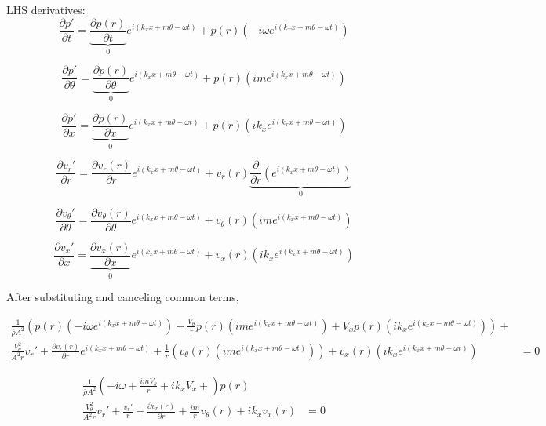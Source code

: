 LHS derivatives:
\[\frac{\partial p'}{\partial t} =
\underbrace{\frac{\partial p(r)}{\partial t}}_{0} e^{i\left(k_x x + m \theta - \omega t \right)} +
p(r) \left(-i\omega e^{i\left(k_x x + m \theta - \omega t \right)}\right) \]

\[\frac{\partial p'}{\partial \theta} = 
\underbrace{\frac{\partial p(r)}{\partial \theta}}_{0} e^{i\left(k_x x + m \theta - \omega t \right)} + 
p(r) \left(im e^{i\left(k_x x + m \theta - \omega t \right)}\right) \]

\[\frac{\partial p'}{\partial x} = \underbrace{\frac{\partial p(r)}{\partial x}}_{0} e^{i\left(k_x x + m \theta - \omega t \right)} +
p(r) \left(ik_x e^{i\left(k_x x + m \theta - \omega t \right)}\right) \]

\[\frac{\partial v_r'}{\partial r} =
\frac{\partial v_r(r)}{\partial r} e^{i\left(k_x x + m \theta - \omega t \right)} +
v_r(r) \underbrace{\frac{\partial }{\partial r}\left( e^{i\left(k_x x + m \theta - \omega t \right)}\right)}_0 \]

\[\frac{\partial v_{\theta}'}{\partial \theta} = 
\frac{\partial v_{\theta}(r)}{\partial \theta} e^{i\left(k_x x + m \theta - \omega t \right)} + 
v_{\theta}(r) \left(im e^{i\left(k_x x + m \theta - \omega t \right)}\right) \]

\[\frac{\partial v_x'}{\partial x} = \underbrace{\frac{\partial v_x(r)}{\partial x}}_{0} e^{i\left(k_x x + m \theta - \omega t \right)} + v_x(r) \left(ik_x e^{i\left(k_x x + m \theta - \omega t \right)}\right) \]

After substituting and canceling common terms,

\begin{align*}
\frac{1}{\bar{\rho} A^2}\left(
p(r) \left(-i\omega e^{i\left(k_x x + m \theta - \omega t \right)}\right) +
\frac{V_{\theta}}{r}
p(r) \left(im e^{i\left(k_x x + m \theta - \omega t \right)}\right) + 
V_x
p(r) \left(ik_x e^{i\left(k_x x + m \theta - \omega t \right)}\right)
\right) + \\
\frac{V_{\theta}^2}{A^2 r}v_r'+
\frac{\partial v_r(r)}{\partial r} e^{i\left(k_x x + m \theta - \omega t \right)} + 
\frac{1}{r}
\left(v_{\theta}(r) \left(im e^{i\left(k_x x + m \theta - \omega t \right)}\right)\right) 
+
v_x(r) \left(ik_x e^{i\left(k_x x + m \theta - \omega t \right)}\right) 
&= 0
\end{align*}

\begin{align*}
\frac{1}{\bar{\rho} A^2} \left(-i\omega + \frac{imV_{\theta}}{r} + ik_xV_x  +
\right)p(r)  \\
\frac{V_{\theta}^2}{A^2 r}v_r'+ \frac{v_r'}{r} +
\frac{\partial v_r(r)}{\partial r}+ 
\frac{im}{r} v_{\theta}(r)
+
ik_xv_x(r) 
&= 0
\end{align*}



